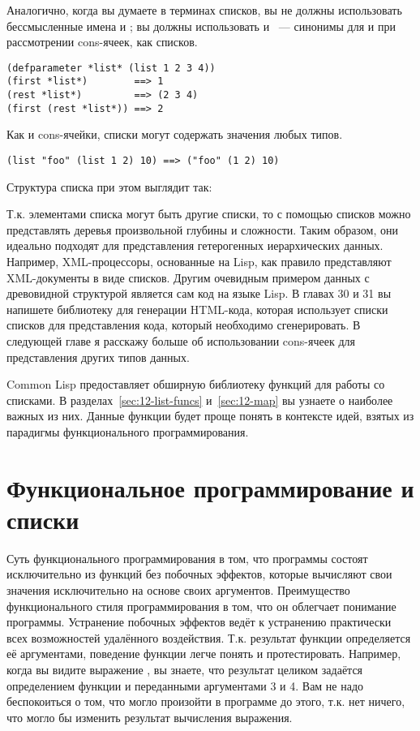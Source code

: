Аналогично, когда вы думаете в терминах списков, вы не должны использовать бессмысленные
имена  и ; вы должны использовать  и ~---
синонимы для  и  при рассмотрении cons-ячеек, как списков.

\begin{lstlisting}
(defparameter *list* (list 1 2 3 4))
(first *list*)        ==> 1
(rest *list*)         ==> (2 3 4)
(first (rest *list*)) ==> 2
\end{lstlisting}

Как и cons-ячейки, списки могут содержать значения любых типов.

\begin{lstlisting}
(list "foo" (list 1 2) 10) ==> ("foo" (1 2) 10)
\end{lstlisting}

Структура списка при этом выглядит так:


Т.к. элементами списка могут быть другие списки, то с помощью списков можно представлять
деревья произвольной глубины и сложности. Таким образом, они идеально подходят для
представления гетерогенных иерархических данных. Например, XML-процессоры, основанные на
Lisp, как правило представляют XML-документы в виде списков. Другим очевидным примером
данных с древовидной структурой является сам код на языке Lisp. В главах 30 и 31 вы
напишете библиотеку для генерации HTML-кода, которая использует списки списков для
представления кода, который необходимо сгенерировать. В следующей главе я расскажу больше
об использовании cons-ячеек для представления других типов данных.

Common Lisp предоставляет обширную библиотеку функций для работы со списками. В
разделах~\ref{sec:12-list-funcs} и~\ref{sec:12-map} вы узнаете о наиболее важных из
них. Данные функции будет проще понять в контексте идей, взятых из парадигмы
функционального программирования.

\section{Функциональное программирование и списки}

Суть функционального программирования в том, что программы состоят исключительно из
функций без побочных эффектов, которые вычисляют свои значения исключительно на основе
своих аргументов. Преимущество функционального стиля программирования в том, что он
облегчает понимание программы. Устранение побочных эффектов ведёт к устранению практически
всех возможностей удалённого воздействия. Т.к. результат функции определяется её
аргументами, поведение функции легче понять и протестировать. Например, когда вы видите
выражение , вы знаете, что результат целиком задаётся определением функции
\code{+} и переданными аргументами 3 и 4. Вам не надо беспокоиться о том, что могло
произойти в программе до этого, т.к. нет ничего, что могло бы изменить результат
вычисления выражения.

